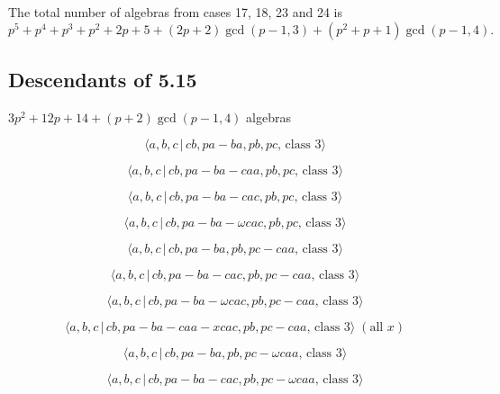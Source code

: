 \documentclass[10pt]{article}
\begin{document}
The total number of algebras from cases 17, 18, 23 and 24 is 
\[
p^{5}+p^{4}+p^{3}+p^{2}+2p+5+(2p+2)\gcd (p-1,3)+(p^{2}+p+1)\gcd (p-1,4). 
\]

\subsection{Descendants of 5.15}

$3p^{2}+12p+14+(p+2)\gcd (p-1,4)$ algebras

\begin{equation}
\langle a,b,c\,|\,cb,pa-ba,pb,pc,\,\text{class }3\rangle  \tag{7.781}
\end{equation}

\begin{equation}
\langle a,b,c\,|\,cb,pa-ba-caa,pb,pc,\,\text{class }3\rangle  \tag{7.782}
\end{equation}

\begin{equation}
\langle a,b,c\,|\,cb,pa-ba-cac,pb,pc,\,\text{class }3\rangle  \tag{7.783}
\end{equation}

\begin{equation}
\langle a,b,c\,|\,cb,pa-ba-\omega cac,pb,pc,\,\text{class }3\rangle 
\tag{7.784}
\end{equation}

\begin{equation}
\langle a,b,c\,|\,cb,pa-ba,pb,pc-caa,\,\text{class }3\rangle  \tag{7.785}
\end{equation}

\begin{equation}
\langle a,b,c\,|\,cb,pa-ba-cac,pb,pc-caa,\,\text{class }3\rangle  \tag{7.786}
\end{equation}

\begin{equation}
\langle a,b,c\,|\,cb,pa-ba-\omega cac,pb,pc-caa,\,\text{class }3\rangle 
\tag{7.787}
\end{equation}

\begin{equation}
\langle a,b,c\,|\,cb,pa-ba-caa-xcac,pb,pc-caa,\,\text{class }3\rangle \;(%
\text{all }x)  \tag{7.788}
\end{equation}

\begin{equation}
\langle a,b,c\,|\,cb,pa-ba,pb,pc-\omega caa,\,\text{class }3\rangle 
\tag{7.789}
\end{equation}

\begin{equation}
\langle a,b,c\,|\,cb,pa-ba-cac,pb,pc-\omega caa,\,\text{class }3\rangle 
\tag{7.790}
\end{equation}
\end{document}
